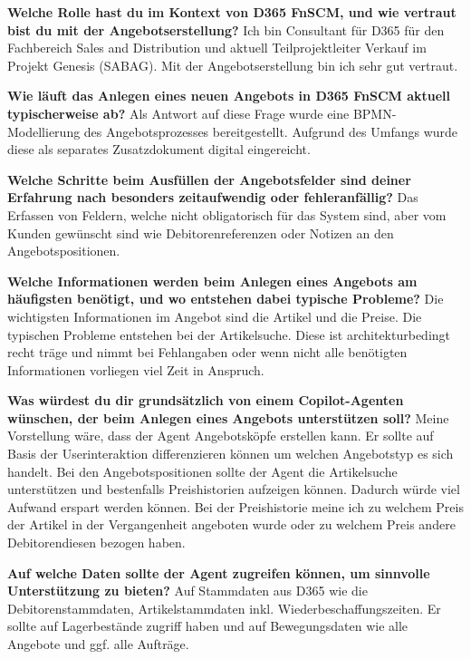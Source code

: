 \textbf{Welche Rolle hast du im Kontext von D365 FnSCM, und wie vertraut bist du mit der Angebotserstellung?}\newline
Ich bin Consultant für D365 für den Fachbereich Sales and Distribution und aktuell Teilprojektleiter Verkauf im Projekt Genesis (SABAG). Mit der Angebotserstellung bin ich sehr gut vertraut. 

\textbf{Wie läuft das Anlegen eines neuen Angebots in D365 FnSCM aktuell typischerweise ab?}\newline
Als Antwort auf diese Frage wurde eine BPMN-Modellierung des Angebotsprozesses bereitgestellt. Aufgrund des Umfangs wurde diese als separates Zusatzdokument digital eingereicht.

\textbf{Welche Schritte beim Ausfüllen der Angebotsfelder sind deiner Erfahrung nach besonders zeitaufwendig oder fehleranfällig?}\newline
Das Erfassen von Feldern, welche nicht obligatorisch für das System sind, aber vom Kunden gewünscht sind wie Debitorenreferenzen oder Notizen an den Angebotspositionen.

\textbf{Welche Informationen werden beim Anlegen eines Angebots am häufigsten benötigt, und wo entstehen dabei typische Probleme?}\newline
Die wichtigsten Informationen im Angebot sind die Artikel und die Preise. Die typischen Probleme entstehen bei der Artikelsuche. Diese ist architekturbedingt recht träge und nimmt bei Fehlangaben oder wenn nicht alle benötigten Informationen vorliegen viel Zeit in Anspruch.

\textbf{Was würdest du dir grundsätzlich von einem Copilot-Agenten wünschen, der beim Anlegen eines Angebots unterstützen soll?}\newline
Meine Vorstellung wäre, dass der Agent Angebotsköpfe erstellen kann. Er sollte auf Basis der Userinteraktion differenzieren können um welchen Angebotstyp es sich handelt. Bei den Angebotspositionen sollte der Agent die Artikelsuche unterstützen und bestenfalls Preishistorien aufzeigen können. Dadurch würde viel Aufwand erspart werden können. Bei der Preishistorie meine ich zu welchem Preis der Artikel in der Vergangenheit angeboten wurde oder zu welchem Preis andere Debitorendiesen bezogen haben. 

\textbf{Auf welche Daten sollte der Agent zugreifen können, um sinnvolle Unterstützung zu bieten?}\newline
Auf Stammdaten aus D365 wie die Debitorenstammdaten, Artikelstammdaten inkl. Wiederbeschaffungszeiten. Er sollte auf Lagerbestände zugriff haben und auf Bewegungsdaten wie alle Angebote und ggf. alle Aufträge.

